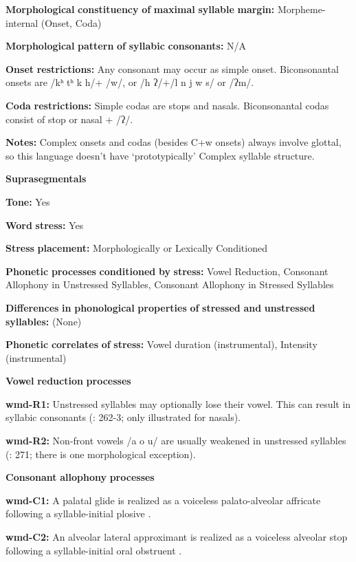\textbf{Morphological} \textbf{constituency} \textbf{of} \textbf{maximal} \textbf{syllable} \textbf{margin:} Morpheme-internal (Onset, Coda)

\textbf{Morphological} \textbf{pattern} \textbf{of} \textbf{syllabic} \textbf{consonants:} N/A

\textbf{Onset} \textbf{restrictions:} Any consonant may occur as simple onset. Biconsonantal onsets are /kʰ tʰ k h/+ /w/, or /h ʔ/+/l n j w s/ or /ʔm/.

\textbf{Coda} \textbf{restrictions:} Simple codas are stops and nasals. Biconsonantal codas consist of stop or nasal + /ʔ/.

\textbf{Notes:} Complex onsets and codas (besides C+w onsets) always involve glottal, so this language doesn’t have ‘prototypically’ Complex syllable structure.

\textbf{Suprasegmentals}

\textbf{Tone:} Yes

\textbf{Word} \textbf{stress:} Yes

\textbf{Stress} \textbf{placement:} Morphologically or Lexically Conditioned

\textbf{Phonetic} \textbf{processes} \textbf{conditioned} \textbf{by} \textbf{stress:} Vowel Reduction, Consonant Allophony in Unstressed Syllables, Consonant Allophony in Stressed Syllables

\textbf{Differences} \textbf{in} \textbf{phonological} \textbf{properties} \textbf{of} \textbf{stressed} \textbf{and} \textbf{unstressed} \textbf{syllables:} (None)

\textbf{Phonetic} \textbf{correlates} \textbf{of} \textbf{stress:} Vowel duration (instrumental), Intensity (instrumental)

\textbf{Vowel} \textbf{reduction} \textbf{processes}

\textbf{wmd-R1:} Unstressed syllables may optionally lose their vowel. This can result in syllabic consonants (\citealt{Eberhard2009}: 262-3; only illustrated for nasals).

\textbf{wmd-R2:} Non-front vowels /a o u/ are usually weakened in unstressed syllables (\citealt{Eberhard2009}: 271; there is one morphological exception).

\textbf{Consonant} \textbf{allophony} \textbf{processes}

\textbf{wmd-C1:} A palatal glide is realized as a voiceless palato-alveolar affricate following a syllable-initial plosive \citep[94]{Eberhard2009}.

\textbf{wmd-C2:} An alveolar lateral approximant is realized as a voiceless alveolar stop following a syllable-initial oral obstruent \citep[92]{Eberhard2009}.

